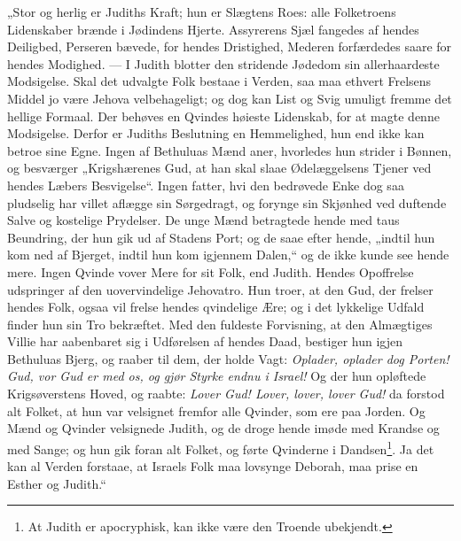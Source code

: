 \documentclass[12pt,a4paper]{book}
\begin{document}
„Stor og herlig er Judiths Kraft; hun er Slægtens Roes: alle Folketroens
Lidenskaber brænde i Jødindens Hjerte. Assyrerens Sjæl fangedes af hendes
Deiligbed, Perseren bævede, for
hendes Dristighed, Mederen forfærdedes saare for hendes Modighed. --- I Judith
blotter den stridende Jødedom sin allerhaardeste Modsigelse. Skal det udvalgte
Folk bestaae i Verden, saa maa ethvert Frelsens Middel jo være Jehova
velbehageligt; og dog kan List og Svig umuligt fremme det hellige Formaal. Der
behøves en Qvindes høieste Lidenskab, for at magte denne Modsigelse. Derfor er
Judiths Beslutning en Hemmelighed, hun end ikke kan betroe sine Egne. Ingen af
Bethuluas Mænd aner, hvorledes hun strider i Bønnen, og besværger
„Krigshærenes Gud, at han skal slaae Ødelæggelsens Tjener ved hendes Læbers
Besvigelse“. Ingen fatter, hvi den bedrøvede Enke dog saa pludselig har villet
aflægge sin Sørgedragt, og forynge sin Skjønhed ved duftende Salve og kostelige
Prydelser. De unge Mænd betragtede hende med taus Beundring, der hun gik ud af
Stadens Port; og de saae efter hende, „indtil hun kom ned af Bjerget, indtil hun
kom igjennem Dalen,“ og de ikke kunde see hende mere. Ingen Qvinde vover Mere
for sit Folk, end Judith. Hendes Opoffrelse udspringer af den uovervindelige
Jehovatro. Hun troer, at den Gud, der frelser hendes Folk, ogsaa vil frelse
hendes qvindelige Ære; og i det lykkelige Udfald finder hun sin Tro bekræftet.
Med den fuldeste Forvisning, at den Almægtiges Villie har aabenbaret sig i
Udførelsen af hendes Daad, bestiger hun igjen Bethuluas Bjerg, og raaber til
dem, der holde Vagt: \emph{Oplader, oplader dog Porten! Gud, vor Gud er med os,
og gjør Styrke endnu i Israel!} Og der hun opløftede Krigsøverstens Hoved, og
raabte: \emph{Lover Gud! Lover, lover, lover Gud!} da forstod alt Folket, at hun
var velsignet fremfor alle Qvinder, som ere paa Jorden. Og Mænd og Qvinder
velsignede Judith, og de droge hende imøde med Krandse og med Sange; og hun gik
foran alt Folket, og førte Qvinderne
i Dandsen\footnote{At Judith er apocryphisk, kan ikke være den Troende
ubekjendt.}. Ja det kan al Verden forstaae, at Israels Folk maa lovsynge
Deborah, maa prise en Esther og Judith.“
\end{document}
